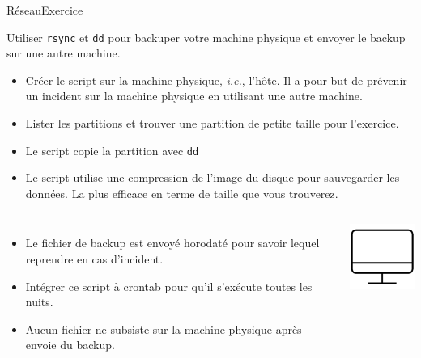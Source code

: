 \documentclass{beamer}
\begin{document}
    \begin{frame}{Réseau}{Exercice \execcounterdispinc}
        \begin{footnotesize}
            Utiliser \lstinline{rsync} et \lstinline{dd} pour backuper votre machine physique et envoyer le backup sur une autre machine.
            \begin{itemize}
                \item Créer le script sur la machine physique, \textit{i.e.}, l'hôte.
                Il a pour but de prévenir un incident sur la machine physique en utilisant une autre machine.
                \item Lister les partitions et trouver une partition de petite taille pour l'exercice.
                \item Le script copie la partition avec \lstinline{dd}
                \item Le script utilise une compression de l'image du disque pour sauvegarder les données.
                La plus efficace en terme de taille que vous trouverez.
            \end{itemize}
            \begin{columns}
                \begin{itemize}
                    \item Le fichier de backup est envoyé horodaté pour savoir lequel reprendre en cas d'incident.
                    \item Intégrer ce script à crontab pour qu'il s'exécute toutes les nuits.
                    \item Aucun fichier ne subsiste sur la machine physique après envoie du backup.
                \end{itemize}
                \begin{center}
                    \includegraphics[width=3cm]{image/desktop}
                \end{center}
            \end{columns}
        \end{footnotesize}
    \end{frame}
\end{document}
